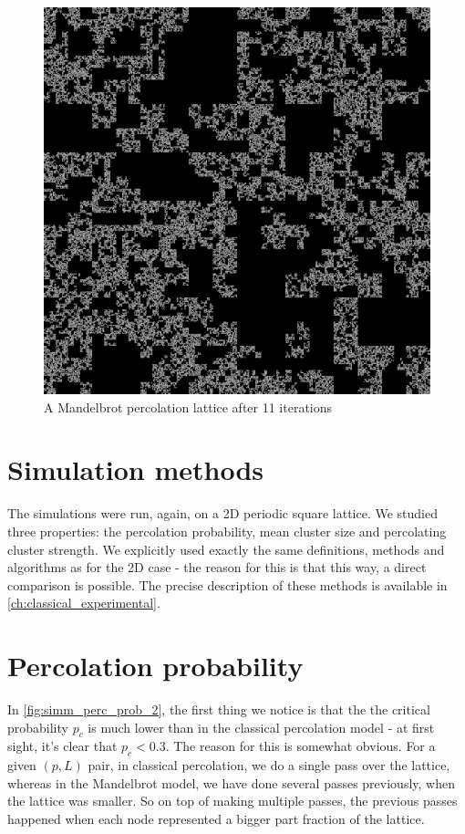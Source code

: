 \begin{figure}[H]
  \includegraphics[width=\linewidth]{Images/mandelbrot_lattice.png}
  \caption{A Mandelbrot percolation lattice after 11 iterations}
  \label{fig:mandelbrot_lattice}
\end{figure}


\section{Simulation methods}

The simulations were run, again, on a 2D periodic square lattice. 
We studied three properties: the percolation probability, mean cluster size and percolating cluster strength. We explicitly used exactly the same definitions, methods and algorithms as for the 2D case - the reason for this is that this way, a direct comparison is possible. The precise description of these methods is available in \autoref{ch:classical_experimental}.

\section{Percolation probability}

In \autoref{fig:simm_perc_prob_2}, the first thing we notice is that the the critical probability $p_c$ is much lower than in the classical percolation model - at first sight, it's clear that $p_c < 0.3$. The reason for this is somewhat obvious. For a given $(p, L)$ pair, in classical percolation, we do a single pass over the lattice, whereas in the Mandelbrot model, we have done several passes previously, when the lattice was smaller. So on top of making multiple passes, the previous passes happened when each node represented a bigger part fraction of the lattice.

